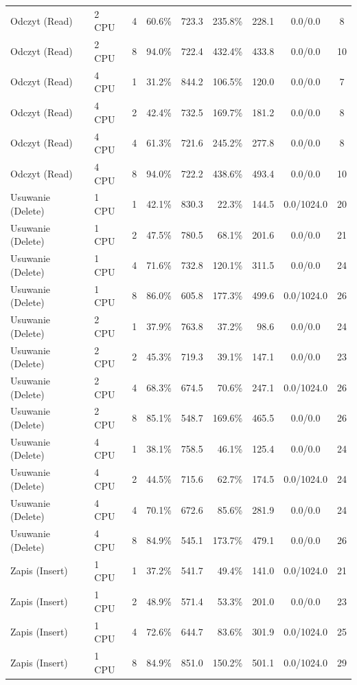 \begin{table}[ht]
{\begin{tabular}{llcrrrrcc}
Odczyt (Read) & 2 CPU & 4 & 60.6\% & 723.3 & 235.8\% & 228.1 & 0.0/0.0 & 8 \\
Odczyt (Read) & 2 CPU & 8 & 94.0\% & 722.4 & 432.4\% & 433.8 & 0.0/0.0 & 10 \\
Odczyt (Read) & 4 CPU & 1 & 31.2\% & 844.2 & 106.5\% & 120.0 & 0.0/0.0 & 7 \\
Odczyt (Read) & 4 CPU & 2 & 42.4\% & 732.5 & 169.7\% & 181.2 & 0.0/0.0 & 8 \\
Odczyt (Read) & 4 CPU & 4 & 61.3\% & 721.6 & 245.2\% & 277.8 & 0.0/0.0 & 8 \\
Odczyt (Read) & 4 CPU & 8 & 94.0\% & 722.2 & 438.6\% & 493.4 & 0.0/0.0 & 10 \\
Usuwanie (Delete) & 1 CPU & 1 & 42.1\% & 830.3 & 22.3\% & 144.5 & 0.0/1024.0 & 20 \\
Usuwanie (Delete) & 1 CPU & 2 & 47.5\% & 780.5 & 68.1\% & 201.6 & 0.0/0.0 & 21 \\
Usuwanie (Delete) & 1 CPU & 4 & 71.6\% & 732.8 & 120.1\% & 311.5 & 0.0/0.0 & 24 \\
Usuwanie (Delete) & 1 CPU & 8 & 86.0\% & 605.8 & 177.3\% & 499.6 & 0.0/1024.0 & 26 \\
Usuwanie (Delete) & 2 CPU & 1 & 37.9\% & 763.8 & 37.2\% & 98.6 & 0.0/0.0 & 24 \\
Usuwanie (Delete) & 2 CPU & 2 & 45.3\% & 719.3 & 39.1\% & 147.1 & 0.0/0.0 & 23 \\
Usuwanie (Delete) & 2 CPU & 4 & 68.3\% & 674.5 & 70.6\% & 247.1 & 0.0/1024.0 & 26 \\
Usuwanie (Delete) & 2 CPU & 8 & 85.1\% & 548.7 & 169.6\% & 465.5 & 0.0/0.0 & 26 \\
Usuwanie (Delete) & 4 CPU & 1 & 38.1\% & 758.5 & 46.1\% & 125.4 & 0.0/0.0 & 24 \\
Usuwanie (Delete) & 4 CPU & 2 & 44.5\% & 715.6 & 62.7\% & 174.5 & 0.0/1024.0 & 24 \\
Usuwanie (Delete) & 4 CPU & 4 & 70.1\% & 672.6 & 85.6\% & 281.9 & 0.0/0.0 & 24 \\
Usuwanie (Delete) & 4 CPU & 8 & 84.9\% & 545.1 & 173.7\% & 479.1 & 0.0/0.0 & 26 \\
Zapis (Insert) & 1 CPU & 1 & 37.2\% & 541.7 & 49.4\% & 141.0 & 0.0/1024.0 & 21 \\
Zapis (Insert) & 1 CPU & 2 & 48.9\% & 571.4 & 53.3\% & 201.0 & 0.0/0.0 & 23 \\
Zapis (Insert) & 1 CPU & 4 & 72.6\% & 644.7 & 83.6\% & 301.9 & 0.0/1024.0 & 25 \\
Zapis (Insert) & 1 CPU & 8 & 84.9\% & 851.0 & 150.2\% & 501.1 & 0.0/1024.0 & 29 \\

\end{tabular}}
\end{table}
